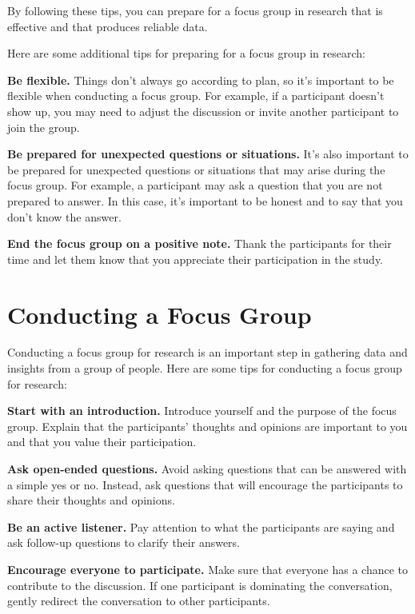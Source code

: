\documentclass[
  b5paper]{book}
\begin{document}
By following these tips, you can prepare for a focus group in research that is effective and that produces reliable data.

Here are some additional tips for preparing for a focus group in research:

\textbf{Be flexible.} Things don't always go according to plan, so it's important to be flexible when conducting a focus group. For example, if a participant doesn't show up, you may need to adjust the discussion or invite another participant to join the group.

\textbf{Be prepared for unexpected questions or situations.} It's also important to be prepared for unexpected questions or situations that may arise during the focus group. For example, a participant may ask a question that you are not prepared to answer. In this case, it's important to be honest and to say that you don't know the answer.

\textbf{End the focus group on a positive note.} Thank the participants for their time and let them know that you appreciate their participation in the study.

\hypertarget{conducting-a-focus-group}{%
\section{Conducting a Focus Group}\label{conducting-a-focus-group}}

Conducting a focus group for research is an important step in gathering data and insights from a group of people. Here are some tips for conducting a focus group for research:

\textbf{Start with an introduction.} Introduce yourself and the purpose of the focus group. Explain that the participants' thoughts and opinions are important to you and that you value their participation.

\textbf{Ask open-ended questions.} Avoid asking questions that can be answered with a simple yes or no. Instead, ask questions that will encourage the participants to share their thoughts and opinions.

\textbf{Be an active listener.} Pay attention to what the participants are saying and ask follow-up questions to clarify their answers.

\textbf{Encourage everyone to participate.} Make sure that everyone has a chance to contribute to the discussion. If one participant is dominating the conversation, gently redirect the conversation to other participants.
\end{document}
